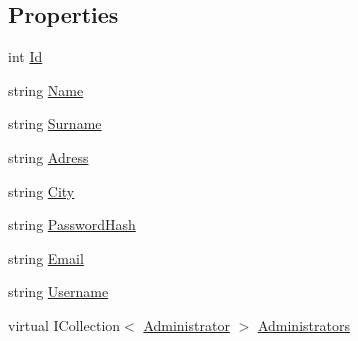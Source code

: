 \subsection*{Properties}
\begin{DoxyCompactItemize}
\item 
int \mbox{\hyperlink{class_easy_library_application_1_1_w_p_f_1_1_model_1_1_user_a023894751467982003b47f4d27200083}{Id}}
\item 
string \mbox{\hyperlink{class_easy_library_application_1_1_w_p_f_1_1_model_1_1_user_ad1cb875021853d13410a6d30fb7fb80b}{Name}}
\item 
string \mbox{\hyperlink{class_easy_library_application_1_1_w_p_f_1_1_model_1_1_user_a3a14e1405cea3a542332bef83af15107}{Surname}}
\item 
string \mbox{\hyperlink{class_easy_library_application_1_1_w_p_f_1_1_model_1_1_user_a3337af20c0e9b33b75f0b266e5364508}{Adress}}
\item 
string \mbox{\hyperlink{class_easy_library_application_1_1_w_p_f_1_1_model_1_1_user_a2a4f1176c68c8d7f0645832e148b5c89}{City}}
\item 
string \mbox{\hyperlink{class_easy_library_application_1_1_w_p_f_1_1_model_1_1_user_a266068fd948f595beb3f694d0731038d}{Password\+Hash}}
\item 
string \mbox{\hyperlink{class_easy_library_application_1_1_w_p_f_1_1_model_1_1_user_a34c51544e46433c3f1f25bde429e2a32}{Email}}
\item 
string \mbox{\hyperlink{class_easy_library_application_1_1_w_p_f_1_1_model_1_1_user_a9dc0762a96daf06550c7fd0cb5929f2b}{Username}}
\item 
virtual I\+Collection$<$ \mbox{\hyperlink{class_easy_library_application_1_1_w_p_f_1_1_model_1_1_administrator}{Administrator}} $>$ \mbox{\hyperlink{class_easy_library_application_1_1_w_p_f_1_1_model_1_1_user_a074be662dc39c0cf1a77d5ad693e480d}{Administrators}}

\end{DoxyCompactItemize}
